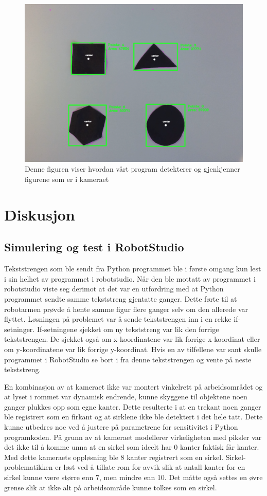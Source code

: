 \documentclass[conference]{IEEEtran}
\begin{document}
    \begin{figure}[!htb]
        \centering
        \includegraphics[width=.8\linewidth]{images/objektene.png}
        \caption{Denne figuren viser hvordan vårt program detekterer og gjenkjenner figurene som er i kameraet}
        \label{resulatet:objekt}
    \end{figure}

    
\section{Diskusjon}
    \subsection{Simulering og test i RobotStudio}
        Tekststrengen som ble sendt fra Python programmet ble i første omgang kun lest i sin helhet av programmet i robotstudio. Når den ble mottatt av programmet i robotstudio viste seg derimot at det var en utfordring med at Python programmet sendte samme tekststreng gjentatte ganger. Dette førte til at robotarmen prøvde å hente samme figur flere ganger selv om den allerede var flyttet. Løsningen på problemet var å sende tekststrengen inn i en rekke if-setninger. If-setningene sjekket om ny tekststreng var lik den forrige tekststrengen. De sjekket også om x-koordinatene var lik forrige x-koordinat eller om y-koordinatene var lik forrige y-koordinat. Hvis en av tilfellene var sant skulle programmet i RobotStudio se bort i fra denne tekststrengen og vente på neste tekststreng.

        En kombinasjon av at kameraet ikke var montert vinkelrett på arbeidsområdet og at lyset i rommet var dynamisk endrende, kunne skyggene til objektene noen ganger plukkes opp som egne kanter. Dette resulterte i at en trekant noen ganger ble registrert som en firkant og at sirklene ikke ble detektert i det hele tatt. Dette kunne utbedres noe ved å justere på parametrene for sensitivitet i Python programkoden. På grunn av at kameraet modellerer virkeligheten med piksler var det ikke til å komme unna at en sirkel som ideelt har 0 kanter faktisk får kanter. Med dette kameraets oppløsning ble 8 kanter registrert som en sirkel. Sirkel-problematikken er løst ved å tillate rom for avvik slik at antall kanter for en sirkel kunne være større enn 7, men mindre enn 10. Det måtte også settes en øvre grense slik at ikke alt på arbeidsområde kunne tolkes som en sirkel. 
\end{document}
